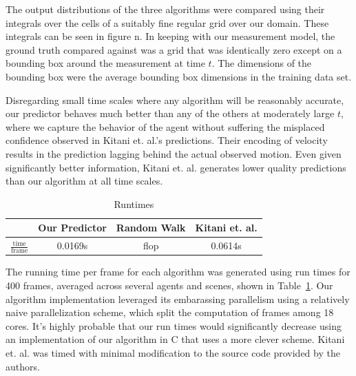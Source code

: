 \documentclass[conference]{IEEEtran}
\begin{document}
The output distributions of the three algorithms were compared using their integrals over the cells of a suitably fine regular grid over our domain. These integrals can be seen in {figure n}. 
In keeping with our measurement model, the ground truth compared against was a grid that was identically zero except on a bounding box around the measurement at time $t$. The dimensions of the bounding box were the average bounding box dimensions in the training data set. 
\label{fig:auc_vs_time}
\label{fig:total_rocs}
\begin{figure}
\end{figure}

Disregarding small time scales where any algorithm will be reasonably accurate, our predictor behaves much better than any of the others at moderately large $t$, where we capture the  behavior of the agent without suffering the misplaced confidence observed in Kitani et. al.'s predictions. Their encoding of velocity results in the prediction lagging behind the actual observed motion. Even given significantly better information, Kitani et. al. generates lower quality predictions than our algorithm at all time scales. 
\begin{table}
\begin{center}
	\caption{Runtimes}
	\label{tab:time}
	\renewcommand{\arraystretch}{1.5}%
	\begin{tabular}{||c | c c  c ||} 
		\hline
		& Our Predictor & Random Walk & Kitani et. al. \\ [0.5ex] 
		\hline 
		$\frac{\mathrm{time}}{\mathrm{frame}}$ & 0.0169s & flop & 0.0614s \\
		\hline
		
	\end{tabular}
	

\end{center}
\end{table}

The running time per frame for each algorithm was generated using run times for 400 frames, averaged across several agents and scenes, shown in Table~\ref{tab:time}. Our algorithm implementation leveraged its embarassing parallelism using a relatively naive parallelization scheme, which split the computation of frames among 18 cores. It's highly probable that our run times would significantly decrease using an implementation of our algorithm in C that uses a more clever scheme. Kitani et. al. was timed with minimal modification to the source code provided by the authors. 
\end{document}
